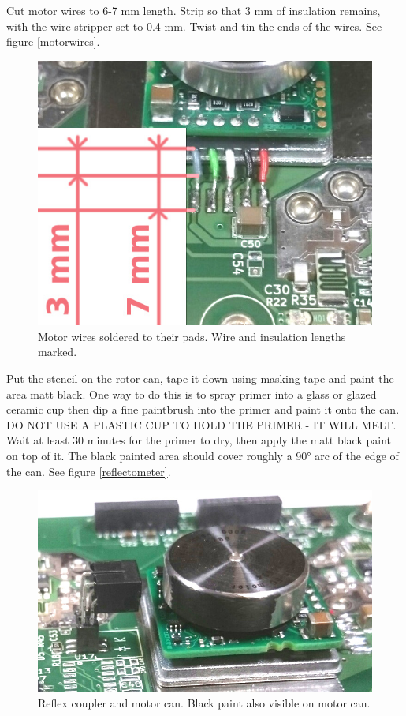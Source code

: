 \documentclass{article}
\begin{document}
Cut motor wires to 6-7 mm length.
Strip so that 3 mm of insulation remains, with the wire stripper set to 0.4 mm.
Twist and tin the ends of the wires. See figure \vref{motorwires}.

\begin{figure}
\centering
\includegraphics[width=12cm]{3mm7mm}
\caption{Motor wires soldered to their pads. Wire and insulation lengths marked.}
\label{motorwires}
\end{figure}

Put the stencil on the rotor can, tape it down using masking tape and paint the area matt black.
One way to do this is to spray primer into a glass or glazed ceramic cup then dip a fine paintbrush into the primer and paint it onto the can.
DO NOT USE A PLASTIC CUP TO HOLD THE PRIMER - IT WILL MELT.
Wait at least 30 minutes for the primer to dry, then apply the matt black paint on top of it.
The black painted area should cover roughly a 90° arc of the edge of the can.
See figure \vref{reflectometer}.

\begin{figure}
\centering
\includegraphics[width=12cm]{reflectometer}
\caption{Reflex coupler and motor can. Black paint also visible on motor can.}
\label{reflectometer}
\end{figure}
\end{document}

